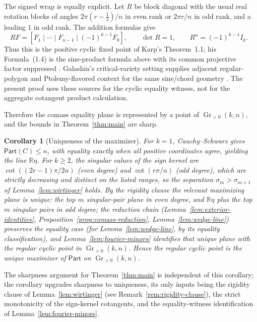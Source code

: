\documentclass[11pt]{article}
\newtheorem{corollary}[theorem]{Corollary}
\newcommand{\Gr}{\operatorname{Gr}}
\newcommand{\Part}{\mathsf{Part}}
\newcommand{\R}{\mathbb{R}}
\begin{document}
The signed wrap is equally explicit. Let \(R\) be block diagonal with
the usual real rotation blocks of angles \(2\pi(r-\tfrac12)/n\) in
even rank or \(2\pi r/n\) in odd rank, and a leading \(1\) in odd rank.
The addition formulas give
\begin{equation}
 RF=[F_1\mid\cdots\mid F_{n-1}\mid(-1)^{k-1}F_0],\qquad
 \det R=1,\qquad R^n=(-1)^{k-1}I_k.
\label{eq:fourier-signed-wrap}
\end{equation}
Thus this is the positive cyclic fixed point of Karp's Theorem~1.1;
his Formula~(1.4) is the sine-product formula above with its common
projective factor suppressed \cite{Karp2018}.
Galashin's critical-variety setting supplies adjacent regular-polygon and
Ptolemy-flavored context for the same sine/chord geometry
\cite{GalashinCritical}.  The present proof uses these sources for the cyclic
equality witness, not for the aggregate cotangent product calculation.

Therefore the comass equality plane is represented by a point of
\(\Gr_{>0}(k,n)\), and the bounds in Theorem~\ref{thm:main} are sharp.

\begin{corollary}[Uniqueness of the maximizer]
\label{cor:uniqueness}
For \(k=1\), Cauchy--Schwarz gives \(\Part(C)\le n\), with equality
exactly when all positive coordinates agree, yielding the line \(\R\eta\).
For \(k\ge2\), the singular values of the sign kernel are \(\cot((2r-1)\pi/2n)\) (even degree)
and \(\cot(r\pi/n)\) (odd degree), which are \emph{strictly decreasing and
distinct} on the listed ranges, so the separation \(\sigma_m>\sigma_{m+1}\) of
Lemma~\ref{lem:wirtinger} holds.  By the rigidity clause the relevant
maximizing plane is \emph{unique}: the top \(m\) singular-pair plane in even
degree, and \(\R\eta\) plus the top \(m\) singular pairs in odd degree;
the reduction chain (Lemma~\ref{lem:exterior-identities},
Proposition~\ref{prop:comass-reduction}, Lemma~\ref{lem:wedge-line}) preserves
the equality case (for Lemma~\ref{lem:wedge-line}, by its equality
classification), and
Lemma~\ref{lem:fourier-minors} identifies that unique
plane with the regular cyclic point in \(\Gr_{>0}(k,n)\).  Hence the regular
cyclic point is the \emph{unique} maximizer of \(\Part\) on \(\Gr_{>0}(k,n)\).
\end{corollary}

\noindent The sharpness argument for Theorem~\ref{thm:main} is
independent of this corollary; the corollary upgrades sharpness to uniqueness,
its only inputs being the rigidity clause of Lemma~\ref{lem:wirtinger} (see
Remark~\ref{rem:rigidity-clause}), the strict monotonicity of
the sign-kernel cotangents, and the equality-witness identification of
Lemma~\ref{lem:fourier-minors}.
\end{document}
